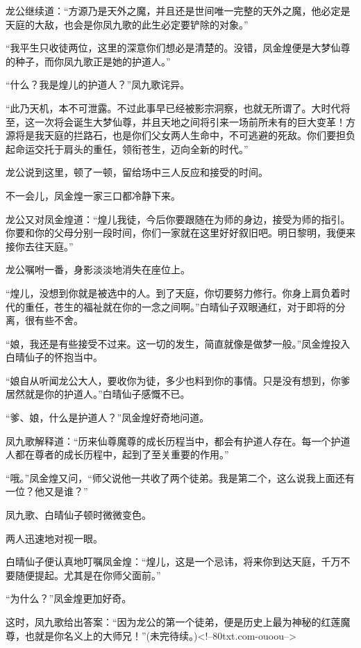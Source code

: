 \begin{this_body}
龙公继续道：“方源乃是天外之魔，并且还是世间唯一完整的天外之魔，他必定是天庭的大敌，也会是你凤九歌的此生必定要铲除的对象。”

“我平生只收徒两位，这里的深意你们想必是清楚的。没错，凤金煌便是大梦仙尊的种子，而你凤九歌正是她的护道人。”

“什么？我是煌儿的护道人？”凤九歌诧异。

“此乃天机，本不可泄露。不过此事早已经被影宗洞察，也就无所谓了。大时代将至，这一次将会诞生大梦仙尊，并且天地之间将引来一场前所未有的巨大变革！方源将是我天庭的拦路石，也是你们父女两人生命中，不可逃避的死敌。你们要担负起命运交托于肩头的重任，领衔苍生，迈向全新的时代。”

龙公说到这里，顿了一顿，留给场中三人反应和接受的时间。

不一会儿，凤金煌一家三口都冷静下来。

龙公又对凤金煌道：“煌儿我徒，今后你要跟随在为师的身边，接受为师的指引。你要和你的父母分别一段时间，你们一家就在这里好好叙旧吧。明日黎明，我便来接你去往天庭。”

龙公嘱咐一番，身影淡淡地消失在座位上。

“煌儿，没想到你就是被选中的人。到了天庭，你切要努力修行。你身上肩负着时代的重任，苍生的福祉就在你的一念之间啊。”白晴仙子双眼通红，对于即将的分离，很有些不舍。

“娘，我还是有些接受不过来。这一切的发生，简直就像是做梦一般。”凤金煌投入白晴仙子的怀抱当中。

“娘自从听闻龙公大人，要收你为徒，多少也料到你的事情。只是没有想到，你爹居然就是你的护道人。”白晴仙子感慨不已。

“爹、娘，什么是护道人？”凤金煌好奇地问道。

凤九歌解释道：“历来仙尊魔尊的成长历程当中，都会有护道人存在。每一个护道人都在尊者的成长历程中，起到了至关重要的作用。”

“哦。”凤金煌又问，“师父说他一共收了两个徒弟。我是第二个，这么说我上面还有一位？他又是谁？”

凤九歌、白晴仙子顿时微微变色。

两人迅速地对视一眼。

白晴仙子便认真地叮嘱凤金煌：“煌儿，这是一个忌讳，将来你到达天庭，千万不要随便提起。尤其是在你师父面前。”

“为什么？”凤金煌更加好奇。

这时，凤九歌给出答案：“因为龙公的第一个徒弟，便是历史上最为神秘的红莲魔尊，也就是你名义上的大师兄！”(未完待续。)<!--80txt.com-ouoou-->

\end{this_body}

